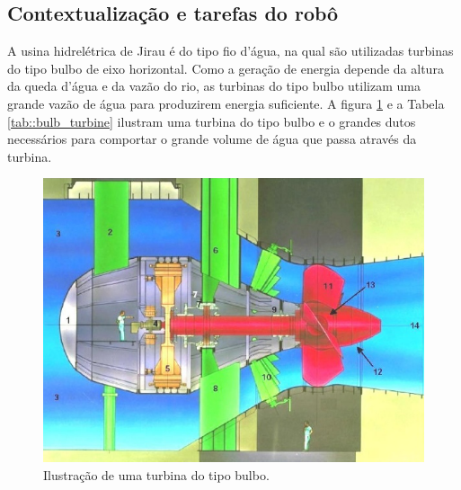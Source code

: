\subsection{Contextualização e tarefas do robô}

A usina hidrelétrica de Jirau é do tipo fio d'água, na qual são utilizadas turbinas do tipo bulbo de eixo horizontal. Como a geração de energia depende da altura da queda
d'água e da vazão do rio, as turbinas do tipo bulbo utilizam uma grande vazão de
água para produzirem energia suficiente. A figura \ref{fig::bulb_turbine} e a Tabela \ref{tab::bulb_turbine}
ilustram uma turbina do tipo bulbo e o grandes dutos necessários para comportar o
grande volume de água que passa através da turbina. 

\begin{figure}[h!]	
	\includegraphics[width=\columnwidth]{figs/intro/bulb_turbine2}
	\caption{Ilustração de uma turbina do tipo bulbo.}
	\label{fig::bulb_turbine}
\end{figure}

